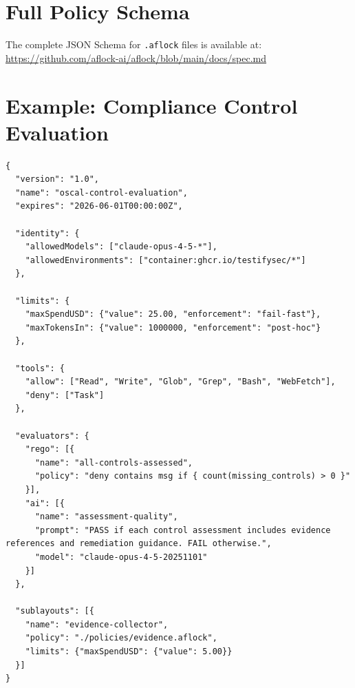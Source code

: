 \documentclass[11pt,a4paper]{article}
\begin{document}
\appendix

\section{Full Policy Schema}
\label{appendix:schema}

The complete JSON Schema for \texttt{.aflock} files is available at:
\url{https://github.com/aflock-ai/aflock/blob/main/docs/spec.md}

\section{Example: Compliance Control Evaluation}

\begin{lstlisting}[style=json,caption={OSCAL compliance evaluation policy}]
{
  "version": "1.0",
  "name": "oscal-control-evaluation",
  "expires": "2026-06-01T00:00:00Z",

  "identity": {
    "allowedModels": ["claude-opus-4-5-*"],
    "allowedEnvironments": ["container:ghcr.io/testifysec/*"]
  },

  "limits": {
    "maxSpendUSD": {"value": 25.00, "enforcement": "fail-fast"},
    "maxTokensIn": {"value": 1000000, "enforcement": "post-hoc"}
  },

  "tools": {
    "allow": ["Read", "Write", "Glob", "Grep", "Bash", "WebFetch"],
    "deny": ["Task"]
  },

  "evaluators": {
    "rego": [{
      "name": "all-controls-assessed",
      "policy": "deny contains msg if { count(missing_controls) > 0 }"
    }],
    "ai": [{
      "name": "assessment-quality",
      "prompt": "PASS if each control assessment includes evidence references and remediation guidance. FAIL otherwise.",
      "model": "claude-opus-4-5-20251101"
    }]
  },

  "sublayouts": [{
    "name": "evidence-collector",
    "policy": "./policies/evidence.aflock",
    "limits": {"maxSpendUSD": {"value": 5.00}}
  }]
}
\end{lstlisting}
\end{document}
